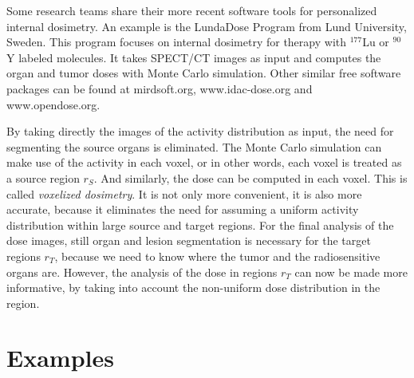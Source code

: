 \documentclass[11pt,oneside]{book}
\begin{document}
Some research teams share their more recent software tools for
personalized internal dosimetry. An example is the LundaDose Program
from Lund University, Sweden. This program focuses on internal
dosimetry for therapy with $^{177}$Lu or $^{90}$Y labeled
molecules. It takes SPECT/CT images as input and computes the organ
and tumor doses with Monte Carlo simulation. Other similar free
software packages can be found at mirdsoft.org, www.idac-dose.org and
www.opendose.org.

By taking directly the images of the activity distribution as input,
the need for segmenting the source organs is eliminated. The Monte
Carlo simulation can make use of the activity in each voxel, or in
other words, each voxel is treated as a source region $r_S$. And
similarly, the dose can be computed in each voxel. This is called {\em
  voxelized dosimetry}. It is not only more convenient, it is also
more accurate, because it eliminates the need for assuming a uniform
activity distribution within large source and target regions. For the
final analysis of the dose images, still organ and lesion segmentation
is necessary for the target regions $r_T$, because we need to know
where the tumor and the radiosensitive organs are. However, the
analysis of the dose in regions $r_T$ can now be made more
informative, by taking into account the non-uniform dose distribution
in the region.

\section{Examples}
\end{document}
